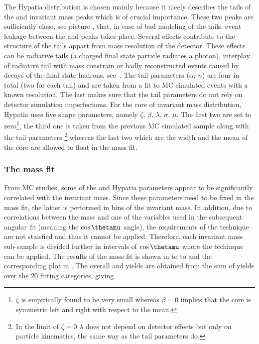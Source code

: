 The Hypatia distribution is chosen mainly because it nicely describes the tails of the \Bs and \Bd invariant mass peaks which is
of crucial importance. These two peaks are sufficiently close,
see picture , that, in case of bad modeling of the tails, event leakage between the \Bs and \Bd peaks 
takes place. Several effects contribute to the structure of the tails appart from mass resolution of the detector. These effects
can be radiative tails (a charged final state particle radiates a photon), interplay of radiative tail with \Jpsi mass constrain
or badly reconstructed events caused by decays of the final state hadrons, see~\cite{Santos:2013gra}. The tail parameters ($\alpha$, $n$)
are four in total (two for each tail) and are taken from a fit to MC simulated events with a known resolution. The last makes sure that
the tail parameters do not rely on detector simulation imperfections. 
For the core of invariant mass distribution, Hypatia uses five shape parameters, namely $\zeta$, $\beta$, $\lambda$, $\sigma$, $\mu$. 
The first two are set to zero\footnote{$\zeta$ is empirically found to be very small whereas
$\beta = 0$ implies that the core is symmetric left and right with respect to the mean.}, the third one is taken from the previous
MC simulated sample along with the tail parameters \footnote{In the limit of $\zeta = 0$ $\lambda$ does not depend on detector 
effects but only on particle kinematics, the same way as the tail parameters do.} whereas the last two which are the width and 
the mean of the core are allowed to float in the mass fit.

\subsubsection{The mass fit}
From MC studies, some of the \Bs and \Bd Hypatia parameters appear to be significantly correlated with the \mkpi invariant mass. 
Since these parameters need to be fixed in the mass fit, the latter is performed in bins of the
\mkpi invariant mass. In addition, due to correlations between the mass and one of the variables used in the subsequent angular fit 
(meaning the $\cos\thetamu$ angle), the requirements of the \sPlot technique are not staisfied and thus it cannot be applied. 
Therefore, each \mkpi invariant mass sub-sample is divided further in intervals of $\cos\thetamu$ where the \sPlot techinque
can be applied.  The results of the mass fit is shown in  to
to  and the corresponding plot in . The overall \Bs and \Bd yields are obtained from the sum 
of yields over the 20 fitting categories, giving

